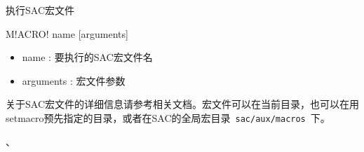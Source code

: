 \label{cmd:macro}

执行SAC宏文件

\begin{SACSTX}
M!ACRO! name [arguments]
\end{SACSTX}

\begin{itemize}
\item name : 要执行的SAC宏文件名
\item arguments : 宏文件参数
\end{itemize}

关于SAC宏文件的详细信息请参考相关文档。宏文件可以在当前目录，也可以在用setmacro预先指定的目录，或者在SAC的全局宏目录~\lstinline{sac/aux/macros}~下。

、
